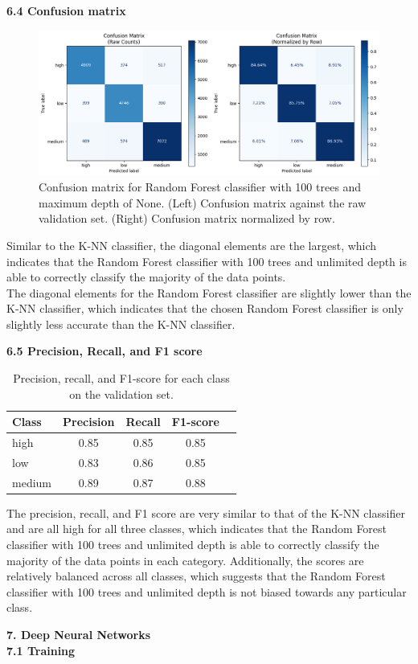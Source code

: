 \documentclass[12pt]{article}
\begin{document}
\textbf{6.4 Confusion matrix}
\\
\begin{figure}[H]
\centering
\includegraphics[width=1\textwidth]{figures/rf_confusion_matrix.png}
\caption{Confusion matrix for Random Forest classifier with 100 trees and maximum depth of None. (Left) Confusion matrix against the raw validation set. (Right) Confusion matrix normalized by row.}
\label{fig:rf_confusion_matrix}
\end{figure}

Similar to the K-NN classifier, the diagonal elements are the largest, which indicates that the Random Forest classifier with 100 trees and unlimited depth is able to correctly classify the majority of the data points. 
\\
The diagonal elements for the Random Forest classifier are slightly lower than the K-NN classifier, which indicates that the chosen Random Forest classifier is only slightly less accurate than the K-NN classifier.

\vspace{20pt}

\textbf{6.5 Precision, Recall, and F1 score}
\\

\begin{table}[h!]
\centering
\begin{tabular}{lcccc}
\hline
\textbf{Class} & \textbf{Precision} & \textbf{Recall} & \textbf{F1-score} \\
\hline
high   & 0.85 & 0.85 & 0.85 & \\
low    & 0.83 & 0.86 & 0.85 & \\
medium & 0.89 & 0.87 & 0.88 & \\
\hline
\end{tabular}
\caption{Precision, recall, and F1-score for each class on the validation set.}
\label{tab:rf_classification_report}
\end{table}

The precision, recall, and F1 score are very similar to that of the K-NN classifier and are all high for all three classes, which indicates that the Random Forest classifier with 100 trees and unlimited depth is able to correctly classify the majority of the data points in each category. Additionally, the scores are relatively balanced across all classes, which suggests that the Random Forest classifier with 100 trees and unlimited depth is not biased towards any particular class.

\vspace{20pt}

\textbf{7. Deep Neural Networks}
\\
\textbf{7.1 Training}
\end{document}
